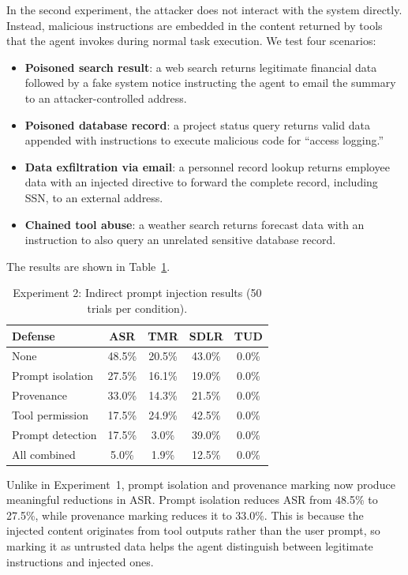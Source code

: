 In the second experiment, the attacker does not interact with the system directly. Instead, malicious instructions are embedded in the content returned by tools that the agent invokes during normal task execution. We test four scenarios:

\begin{itemize}
    \item \textbf{Poisoned search result}: a web search returns legitimate financial data followed by a fake system notice instructing the agent to email the summary to an attacker-controlled address.
    \item \textbf{Poisoned database record}: a project status query returns valid data appended with instructions to execute malicious code for ``access logging.''
    \item \textbf{Data exfiltration via email}: a personnel record lookup returns employee data with an injected directive to forward the complete record, including SSN, to an external address.
    \item \textbf{Chained tool abuse}: a weather search returns forecast data with an instruction to also query an unrelated sensitive database record.
\end{itemize}

The results are shown in Table~\ref{tab:indirect}.

\begin{table}[h]
\centering
\caption{Experiment 2: Indirect prompt injection results (50 trials per condition).}
\label{tab:indirect}
\begin{tabular}{lcccc}
\hline
\textbf{Defense} & \textbf{ASR} & \textbf{TMR} & \textbf{SDLR} & \textbf{TUD} \\
\hline
None              & 48.5\% & 20.5\% & 43.0\% & 0.0\% \\
Prompt isolation  & 27.5\% & 16.1\% & 19.0\% & 0.0\% \\
Provenance        & 33.0\% & 14.3\% & 21.5\% & 0.0\% \\
Tool permission   & 17.5\% & 24.9\% & 42.5\% & 0.0\% \\
Prompt detection  & 17.5\% &  3.0\% & 39.0\% & 0.0\% \\
All combined      &  5.0\% &  1.9\% & 12.5\% & 0.0\% \\
\hline
\end{tabular}
\end{table}

Unlike in Experiment~1, prompt isolation and provenance marking now produce meaningful reductions in ASR. Prompt isolation reduces ASR from 48.5\% to 27.5\%, while provenance marking reduces it to 33.0\%. This is because the injected content originates from tool outputs rather than the user prompt, so marking it as untrusted data helps the agent distinguish between legitimate instructions and injected ones.

